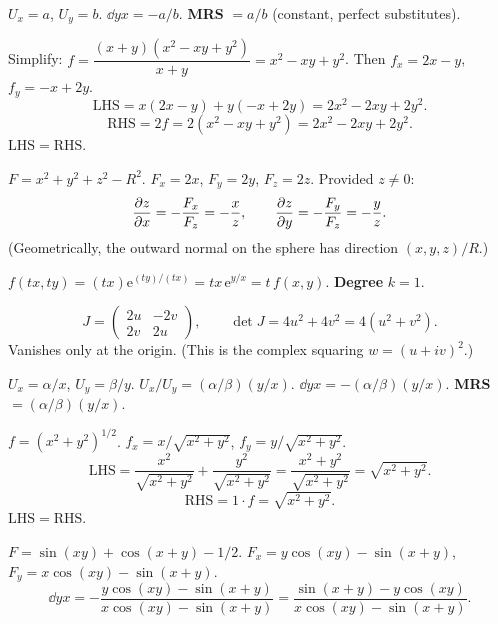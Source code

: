 \begin{solutions}
  \item $U_{x}=a$, $U_{y}=b$. $\dd{y}{x}=-a/b$. \textbf{MRS} $=a/b$
        (constant, perfect substitutes).

  \item Simplify: $f=\dfrac{(x+y)(x^{2}-xy+y^{2})}{x+y}=x^{2}-xy+y^{2}$.
        Then $f_{x}=2x-y$, $f_{y}=-x+2y$.
        \[
          \mathrm{LHS}=x(2x-y)+y(-x+2y)=2x^{2}-2xy+2y^{2} .
        \]
        \[
          \mathrm{RHS}=2f=2(x^{2}-xy+y^{2})=2x^{2}-2xy+2y^{2} .
        \]
        $\mathrm{LHS}=\mathrm{RHS}$. \checkmark

  \item $F=x^{2}+y^{2}+z^{2}-R^{2}$. $F_{x}=2x$, $F_{y}=2y$, $F_{z}=2z$.
        Provided $z\neq 0$:
        \[
          \frac{\partial z}{\partial x}=-\frac{F_{x}}{F_{z}}=-\frac{x}{z},\qquad
          \frac{\partial z}{\partial y}=-\frac{F_{y}}{F_{z}}=-\frac{y}{z} .
        \]
        (Geometrically, the outward normal on the sphere has direction
        $(x,y,z)/R$.)

  \item $f(tx,ty)=(tx)\mathrm{e}^{(ty)/(tx)}=tx\,\mathrm{e}^{y/x}
        =t\,f(x,y)$. \textbf{Degree} $k=1$.

  \item
        \[
          J=\begin{pmatrix} 2u & -2v\\ 2v & 2u\end{pmatrix},\qquad
          \det J=4u^{2}+4v^{2}=4(u^{2}+v^{2}) .
        \]
        Vanishes only at the origin. (This is the complex squaring
        $w=(u+iv)^{2}$.)

  \item $U_{x}=\alpha/x$, $U_{y}=\beta/y$. $U_{x}/U_{y}=(\alpha/\beta)(y/x)$.
        $\dd{y}{x}=-(\alpha/\beta)(y/x)$. \textbf{MRS}
        $=(\alpha/\beta)(y/x)$.

  \item $f=(x^{2}+y^{2})^{1/2}$. $f_{x}=x/\sqrt{x^{2}+y^{2}}$,
        $f_{y}=y/\sqrt{x^{2}+y^{2}}$.
        \[
          \mathrm{LHS}=\frac{x^{2}}{\sqrt{x^{2}+y^{2}}}
            +\frac{y^{2}}{\sqrt{x^{2}+y^{2}}}
            =\frac{x^{2}+y^{2}}{\sqrt{x^{2}+y^{2}}}=\sqrt{x^{2}+y^{2}} .
        \]
        \[
          \mathrm{RHS}=1\cdot f=\sqrt{x^{2}+y^{2}} .
        \]
        $\mathrm{LHS}=\mathrm{RHS}$. \checkmark

  \item $F=\sin(xy)+\cos(x+y)-1/2$. $F_{x}=y\cos(xy)-\sin(x+y)$,
        $F_{y}=x\cos(xy)-\sin(x+y)$.
        \[
          \dd{y}{x} = -\frac{y\cos(xy)-\sin(x+y)}{x\cos(xy)-\sin(x+y)}
            = \frac{\sin(x+y)-y\cos(xy)}{x\cos(xy)-\sin(x+y)} .
        \]


\end{solutions}

